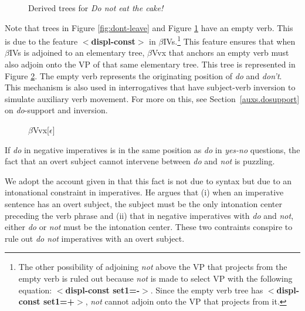 \begin{figure}[htbp]
\begin{center} \leavevmode 
{} 
\end{center}
\caption{Derived trees for {\it Do not eat the cake!}}
\label{fig:do-not-leave}
\end{figure} 

Note that  trees in Figure \ref{fig:dont-leave} and Figure
\ref{fig:do-not-leave} have an empty verb.  This is due to the feature
{\bf $<$displ-const$>$} in $\beta$IVs.\footnote{The other possibility of
adjoining {\it not} above the VP that projects from the empty verb is ruled
out because {\it not} is made to select VP with the following equation:
{\bf $<$displ-const set1=-$>$}.  Since the empty verb tree has {\bf
$<$displ-const set1=+$>$}, {\it not} cannot adjoin onto the VP that
projects from it.} This feature ensures that when $\beta$IVs is adjoined to
an elementary tree, $\beta$Vvx that anchors an empty verb must also adjoin
onto the VP of that same elementary tree.  This tree is represented in
Figure \ref{fig:epsilon}.  The empty verb represents the originating
position of {\it do} and {\it don't}.  This mechanism is also used in
interrogatives that have subject-verb inversion to simulate auxiliary verb
movement.  For more on this, see Section~\ref{auxs.dosupport} on {\it
do}-support and inversion.

\begin{figure}[htbp]
  \begin{center} \leavevmode {}
  \end{center}
  \caption{$\beta$Vvx[$\epsilon$]}
\label{fig:epsilon}
\end{figure} 

If {\it do} in negative imperatives is in the same position as {\it do} in
{\it yes-no} questions, the fact that an overt subject cannot intervene
between {\it do} and {\it not} is puzzling.


We adopt the account given in \cite{akmajian84} that this fact is not due
to syntax but due to an intonational constraint in imperatives.  He argues
that (i) when an imperative sentence has an overt subject, the subject must be
the only intonation center preceding the verb phrase and (ii) that in
negative imperatives with {\it do} and {\it not}, either {\it do} or {\it
not} must be the intonation center.  These two contraints conspire to rule
out {\it do not} imperatives with an overt subject.

